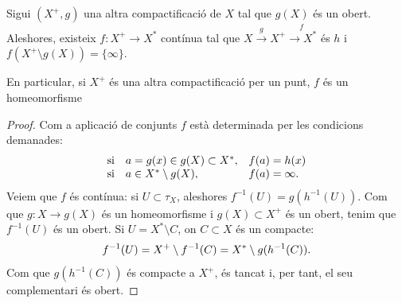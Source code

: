 \documentclass[../main.tex]{subfiles}
\begin{document}
\begin{prop}
\label{prop:unicitatdalexandroff} Sigui $(X^+,g)$ una altra compactificació de $X$ tal que $g(X)$ és un obert. Aleshores, existeix $f:X^+\rightarrow X^*$ contínua tal que $X\overset{g}{\longrightarrow} X^+\overset{f}{\longrightarrow X^*}$ és $h$ i $f(X^+\setminus g(X))=\{\infty\}$.

En particular, si $X^+$ és una altra compactificació per un punt, $f$ és un homeomorfisme
\end{prop}
\begin{proof}
Com a aplicació de conjunts $f$ està determinada per les condicions demanades:
\begin{equation}
    \notag
    \begin{array}{lll}
        \text{si} & a=g(x)\in g(X)\subset X^*, & f(a) = h(x) \\
        \text{si} & a\in X^*\setminus g(X), & f(a)=\infty.
    \end{array}
\end{equation}
Veiem que $f$ és contínua: si $U\subset \tau_X$, aleshores $f^{-1}(U) = g(h^{-1}(U))$. Com que $g:X\rightarrow g(X)$ és un homeomorfisme i $g(X)\subset X^+$ és un obert, tenim que $f^{-1}(U)$ és un obert. Si $U = X^*\setminus C$, on $C\subset X$ és un compacte:
\begin{equation}
    \notag
    f^{-1}(U) = X^+\setminus f^{-1}(C)=X^*\setminus g(h^{-1}(C)).
\end{equation}
Com que $g(h^{-1}(C))$ és compacte a $X^+$, és tancat i, per tant, el seu complementari és obert.
\end{proof}
\end{document}

